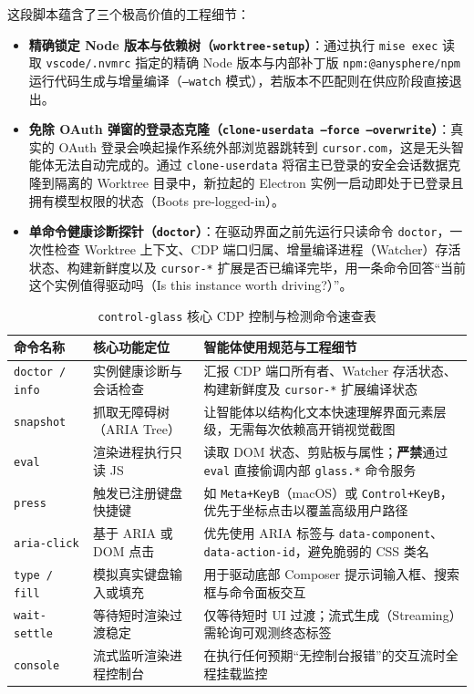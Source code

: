 \documentclass[a4paper]{article}
\begin{document}
这段脚本蕴含了三个极高价值的工程细节：
\begin{itemize}
  \item \textbf{精确锁定 Node 版本与依赖树（\texttt{worktree-setup}）}：通过执行 \texttt{mise exec} 读取 \texttt{vscode/.nvmrc} 指定的精确 Node 版本与内部补丁版 \texttt{npm:@anysphere/npm} 运行代码生成与增量编译（\texttt{--watch} 模式），若版本不匹配则在供应阶段直接退出。
  \item \textbf{免除 OAuth 弹窗的登录态克隆（\texttt{clone-userdata --force --overwrite}）}：真实的 OAuth 登录会唤起操作系统外部浏览器跳转到 \texttt{cursor.com}，这是无头智能体无法自动完成的。通过 \texttt{clone-userdata} 将宿主已登录的安全会话数据克隆到隔离的 Worktree 目录中，新拉起的 Electron 实例一启动即处于已登录且拥有模型权限的状态（Boots pre-logged-in）。
  \item \textbf{单命令健康诊断探针（\texttt{doctor}）}：在驱动界面之前先运行只读命令 \texttt{doctor}，一次性检查 Worktree 上下文、CDP 端口归属、增量编译进程（Watcher）存活状态、构建新鲜度以及 \texttt{cursor-*} 扩展是否已编译完毕，用一条命令回答“当前这个实例值得驱动吗（Is this instance worth driving?）”。
\end{itemize}

\begin{table}[H]
  \centering
  \caption{\texttt{control-glass} 核心 CDP 控制与检测命令速查表}
  \small
  \begin{tabular}{p{2.8cm} p{3.8cm} p{6.8cm}}
    \toprule
    \textbf{命令名称} & \textbf{核心功能定位} & \textbf{智能体使用规范与工程细节} \\
    \midrule
    \texttt{doctor / info} & 实例健康诊断与会话检查 & 汇报 CDP 端口所有者、Watcher 存活状态、构建新鲜度及 \texttt{cursor-*} 扩展编译状态 \\
    \texttt{snapshot} & 抓取无障碍树（ARIA Tree） & 让智能体以结构化文本快速理解界面元素层级，无需每次依赖高开销视觉截图 \\
    \texttt{eval} & 渲染进程执行只读 JS & 读取 DOM 状态、剪贴板与属性；\textbf{严禁}通过 \texttt{eval} 直接偷调内部 \texttt{glass.*} 命令服务 \\
    \texttt{press} & 触发已注册键盘快捷键 & 如 \texttt{Meta+KeyB}（macOS）或 \texttt{Control+KeyB}，优先于坐标点击以覆盖高级用户路径 \\
    \texttt{aria-click} & 基于 ARIA 或 DOM 点击 & 优先使用 ARIA 标签与 \texttt{data-component}、\texttt{data-action-id}，避免脆弱的 CSS 类名 \\
    \texttt{type / fill} & 模拟真实键盘输入或填充 & 用于驱动底部 Composer 提示词输入框、搜索框与命令面板交互 \\
    \texttt{wait-settle} & 等待短时渲染过渡稳定 & 仅等待短时 UI 过渡；流式生成（Streaming）需轮询可观测终态标签 \\
    \texttt{console} & 流式监听渲染进程控制台 & 在执行任何预期“无控制台报错”的交互流时全程挂载监控 \\
    \bottomrule
  \end{tabular}
\end{table}
\end{document}
